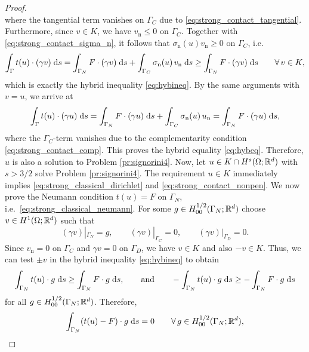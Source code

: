 \begin{proof}
\begin{equation*}
	\end{equation*}
	where the tangential term vanishes on $\Gamma_C$ due to \eqref{eq:strong_contact_tangential}. Furthermore, since $v\in K$, we have $v_\mathrm{n}\le 0$ on $\Gamma_C$. Together with \eqref{eq:strong_contact_sigma_n}, it follows that $\sigma_\mathrm{n}(u)v_\mathrm{n}\ge 0$ on $\Gamma_C$, i.e.
	\begin{equation*}
		\int_\Gamma t(u)\cdot(\gamma v)\;{{\mathrm{d}} s} = \int_{\Gamma_N}F\cdot(\gamma v)\;{{\mathrm{d}} s} + \int_{\Gamma_C}\sigma_\mathrm{n}(u)\,v_\mathrm{n}\;{{\mathrm{d}} s} \ge \int_{\Gamma_N}F\cdot(\gamma v)\;{{\mathrm{d}} s}\qquad\forall\, v\in K,
	\end{equation*}
	which is exactly the hybrid inequality \eqref{eq:hybineq}. By the same arguments with $v = u$, we arrive at
	\begin{equation*}
		\int_\Gamma t(u)\cdot(\gamma u)\;{{\mathrm{d}} s} = \int_{\Gamma_N}F\cdot(\gamma u)\;{{\mathrm{d}} s} +\int_{\Gamma_C}\sigma_\mathrm{n}(u)\,u_{\mathrm{n}} = \int_{\Gamma_N}F\cdot(\gamma u)\;{{\mathrm{d}} s},
	\end{equation*}
	where the $\Gamma_C$-term vanishes due to the complementarity condition \eqref{eq:strong_contact_comp}. This proves the hybrid equality \eqref{eq:hybeq}. Therefore, $u$ is also a solution to Problem \ref{pr:signorini4}. Now, let $u\in K\cap H^s(\Omega;{\mathbb R}^d)$ with $s>3/2$ solve Problem \ref{pr:signorini4}. The requirement $u\in K$ immediately implies \eqref{eq:strong_classical_dirichlet} and \eqref{eq:strong_contact_nonpen}. We now prove the Neumann condition $t(u) = F$ on $\Gamma_N$, i.e.\ \eqref{eq:strong_classical_neumann}. For some $g\in H_{00}^{1/2}(\Gamma_N;{\mathbb R}^d)$ choose $v\in H^1(\Omega;{\mathbb R}^d)$ such that
	\begin{equation*}
		(\gamma v)|_{\Gamma_N} = g,\qquad (\gamma v)|_{\Gamma_C} = 0,\qquad (\gamma v)|_{\Gamma_D} = 0.
	\end{equation*}
	Since $v_\mathrm{n}= 0$ on $\Gamma_C$ and $\gamma v = 0$ on $\Gamma_D$, we have $v\in K$ and also $-v\in K$. Thus, we can test $\pm v$ in the hybrid inequality \eqref{eq:hybineq} to obtain
	\begin{equation*}
		\int_{\Gamma_N}t(u)\cdot g\;{{\mathrm{d}} s}\ge \int_{\Gamma_N} F\cdot g\;{{\mathrm{d}} s},\qquad\text{and}\qquad -\int_{\Gamma_N}t(u)\cdot g\;{{\mathrm{d}} s}\ge -\int_{\Gamma_N} F\cdot g\;{{\mathrm{d}} s}
	\end{equation*}
	for all $g\in H_{00}^{1/2}(\Gamma_N;{\mathbb R}^d)$. Therefore,
	\begin{equation*}
		\int_{\Gamma_N} (t(u)- F)\cdot g\;{{\mathrm{d}} s} = 0\qquad\forall\,g\in H_{00}^{1/2}(\Gamma_N;{\mathbb R}^d),
	\end{equation*}

\end{proof}
